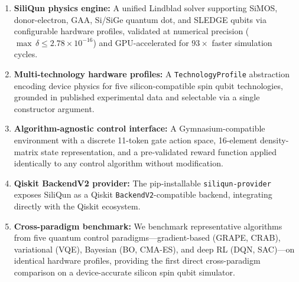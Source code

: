 \begin{enumerate}
  \item \textbf{SiliQun physics engine:} A unified Lindblad solver supporting
    SiMOS, donor-electron, GAA, Si/SiGe quantum dot, and SLEDGE qubits via
    configurable hardware profiles, validated at numerical precision
    ($\max\,\delta \leq 2.78 \times 10^{-16}$) and GPU-accelerated for
    $93\times$ faster simulation cycles.
  \item \textbf{Multi-technology hardware profiles:} A \texttt{TechnologyProfile}
    abstraction encoding device physics for five silicon-compatible spin qubit
    technologies, grounded in published experimental data and selectable via a
    single constructor argument.
  \item \textbf{Algorithm-agnostic control interface:} A Gymnasium-compatible
    environment with a discrete 11-token gate action space, 16-element
    density-matrix state representation, and a pre-validated reward function
    applied identically to any control algorithm without modification.
  \item \textbf{Qiskit BackendV2 provider:} The pip-installable
    \texttt{siliqun-provider} exposes SiliQun as a Qiskit
    \texttt{BackendV2}-compatible backend, integrating directly with the Qiskit
    ecosystem.
  \item \textbf{Cross-paradigm benchmark:} We benchmark representative
    algorithms from five quantum control paradigms—gradient-based (GRAPE, CRAB),
    variational (VQE), Bayesian (BO, CMA-ES), and deep RL (DQN, SAC)—on
    identical hardware profiles, providing the first direct cross-paradigm
    comparison on a device-accurate silicon spin qubit simulator.
\end{enumerate}
